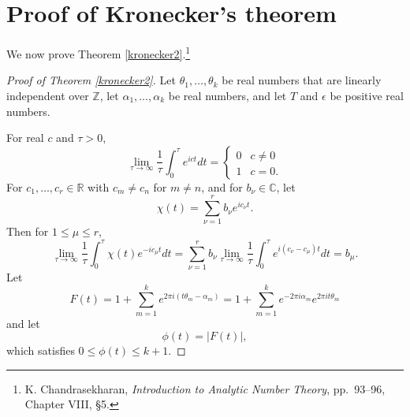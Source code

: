 \documentclass{article}
\theoremstyle{definition}
\begin{document}
\section{Proof of Kronecker's theorem}
We now prove Theorem \ref{kronecker2}.\footnote{K. Chandrasekharan, {\em Introduction to Analytic Number Theory},
pp.~93--96, Chapter VIII, \S 5.}

\begin{proof}[Proof of Theorem \ref{kronecker2}]
Let $\theta_1,\ldots,\theta_k$ be real numbers that are linearly
independent over $\mathbb{Z}$, let $\alpha_1,\ldots,\alpha_k$ be real numbers,
and let $T$ and $\epsilon$ be positive real numbers. 

For real $c$ and $\tau>0$, 
\[
\lim_{\tau \to \infty} \frac{1}{\tau} \int_0^\tau e^{ict} dt = 
\begin{cases}
0&c \neq 0\\
1&c = 0.
\end{cases}
\]
For $c_1,\ldots,c_r \in \mathbb{R}$ with $c_m \neq c_n$ for $m \neq n$, and for $b_\nu \in \mathbb{C}$, let
\[
\chi(t) = \sum_{\nu=1}^r b_\nu e^{ic_\nu t}.
\]
Then for $1 \leq \mu \leq r$,
\[
\lim_{\tau \to \infty} \frac{1}{\tau} \int_0^\tau \chi(t) e^{-ic_\mu t} dt
=\sum_{\nu=1}^r b_\nu  \lim_{\tau \to \infty} \frac{1}{\tau} \int_0^\tau e^{i(c_\nu - c_\mu)t} dt
=b_\mu.
\]
Let
\[
F(t) = 1 + \sum_{m=1}^k e^{2\pi i(t\theta_m - \alpha_m)} = 1+ \sum_{m=1}^k e^{-2\pi i\alpha_m}
e^{2\pi it\theta_m}
\]
and let
\[
\phi(t) = |F(t)|,
\]
which satisfies $0 \leq \phi(t) \leq k+1$. 


\end{proof}
\end{document}
